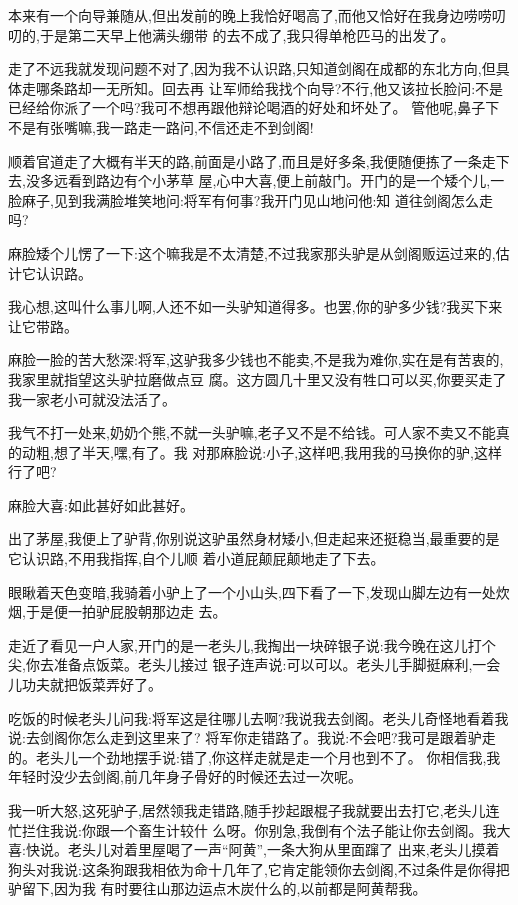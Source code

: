 ﻿\documentclass[12pt,twocolumn]{article}
\begin{document}
本来有一个向导兼随从,但出发前的晚上我恰好喝高了,而他又恰好在我身边唠唠叨叨的,于是第二天早上他满头绷带
的去不成了,我只得单枪匹马的出发了。

走了不远我就发现问题不对了,因为我不认识路,只知道剑阁在成都的东北方向,但具体走哪条路却一无所知。回去再
让军师给我找个向导?不行,他又该拉长脸问:不是已经给你派了一个吗?我可不想再跟他辩论喝酒的好处和坏处了。
管他呢,鼻子下不是有张嘴嘛,我一路走一路问,不信还走不到剑阁!

顺着官道走了大概有半天的路,前面是小路了,而且是好多条,我便随便拣了一条走下去,没多远看到路边有个小茅草
屋,心中大喜,便上前敲门。开门的是一个矮个儿,一脸麻子,见到我满脸堆笑地问:将军有何事?我开门见山地问他:知
道往剑阁怎么走吗?

麻脸矮个儿愣了一下:这个嘛\dldots 我是不太清楚,不过我家那头驴是从剑阁贩运过来的,估计它认识路。

我心想,这叫什么事儿啊,人还不如一头驴知道得多。也罢,你的驴多少钱?我买下来让它带路。

麻脸一脸的苦大愁深:将军,这驴我多少钱也不能卖,不是我为难你,实在是有苦衷的,我家里就指望这头驴拉磨做点豆
腐。这方圆几十里又没有牲口可以买,你要买走了我一家老小可就没法活了。

我气不打一处来,奶奶个熊,不就一头驴嘛,老子又不是不给钱。可人家不卖又不能真的动粗,想了半天,嘿,有了。我
对那麻脸说:小子,这样吧,我用我的马换你的驴,这样行了吧?

麻脸大喜:如此甚好如此甚好。

出了茅屋,我便上了驴背,你别说这驴虽然身材矮小,但走起来还挺稳当,最重要的是它认识路,不用我指挥,自个儿顺
着小道屁颠屁颠地走了下去。

眼瞅着天色变暗,我骑着小驴上了一个小山头,四下看了一下,发现山脚左边有一处炊烟,于是便一拍驴屁股朝那边走
去。

走近了看见一户人家,开门的是一老头儿,我掏出一块碎银子说:我今晚在这儿打个尖,你去准备点饭菜。老头儿接过
银子连声说:可以可以。老头儿手脚挺麻利,一会儿功夫就把饭菜弄好了。

吃饭的时候老头儿问我:将军这是往哪儿去啊?我说我去剑阁。老头儿奇怪地看着我说:去剑阁你怎么走到这里来了?
将军你走错路了。我说:不会吧?我可是跟着驴走的。老头儿一个劲地摆手说:错了,你这样走就是走一个月也到不了。
你相信我,我年轻时没少去剑阁,前几年身子骨好的时候还去过一次呢。

我一听大怒,这死驴子,居然领我走错路,随手抄起跟棍子我就要出去打它,老头儿连忙拦住我说:你跟一个畜生计较什
么呀。你别急,我倒有个法子能让你去剑阁。我大喜:快说。老头儿对着里屋喝了一声``阿黄'',一条大狗从里面蹿了
出来,老头儿摸着狗头对我说:这条狗跟我相依为命十几年了,它肯定能领你去剑阁,不过条件是你得把驴留下,因为我
有时要往山那边运点木炭什么的,以前都是阿黄帮我。
\end{document}
